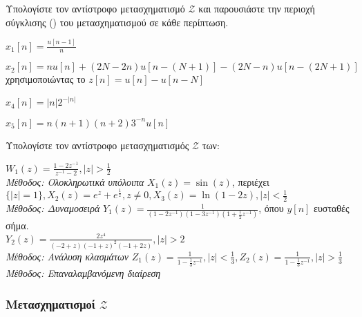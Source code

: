 \documentclass{assignment}
\begin{document}


Υπολογίστε τον αντίστροφο μετασχηματισμό $\mathscr{Z}$ και παρουσιάστε 
την περιοχή σύγκλισης () του μετασχηματισμού σε κάθε περίπτωση.

\begin{questions}

 $x_1[n] = \frac{u[n-1]}{n}$

 $x_2[n] = nu[n] +(2N-2n)u[n - (N+1)] - (2N - n)u[n-(2N+1)]$\\
          χρησιμοποιώντας το $z[n]=u[n]-u[n-N]$


 $x_4[n] = |n|2^{-|n|}$

 $x_5[n] = n(n+1)(n+2)3^{-n}u[n]$

\end{questions}
Υπολογίστε τον αντίστροφο μετασχηματισμός $\mathscr{Z}$ των:

\begin{questions}

 $\displaystyle W_1(z) = \frac{1-2z^{-1}}{z^{-1}-2}, |z| > \frac{1}{2}$ \\
             {\itshape Μέθοδος: Ολοκληρωτικά υπόλοιπα}
 $\displaystyle  X_1(z) = \sin(z)$,  περιέχει $\{|z|=1\}, X_2(z)=e^z+e^{\frac{1}{z}}, z \neq 0, X_3(z)=\ln(1-2z),|z| < \frac{1}{2}$\\
             {\itshape Μέθοδος: Δυναμοσειρά}
 $\displaystyle Y_1(z) = \frac{1}{(1-2z^{-1})(1-3z^{-1})(1+\frac{1}{2}z^{-1})}$, όπου $y[n]$ ευσταθές σήμα.\\
             $\displaystyle Y_2(z) = \frac{2z^4}{(-2+z)(-1+z)^2(-1+2z)}, |z| > 2$\\
             {\itshape Μέθοδος: Ανάλυση κλασμάτων}
 $\displaystyle Z_1(z) = \frac{1}{1-\frac{1}{3}z^{-1}}, |z| < \frac{1}{3}, Z_2(z) = \frac{1}{1-\frac{1}{3}z^{-1}}, |z| > \frac{1}{3}$ \\
             {\itshape Μέθοδος: Επαναλαμβανόμενη διαίρεση}

\end{questions}

\solution

\subsubsection*{Μετασχηματισμοί $\mathscr{Z}$} 
\end{document}
